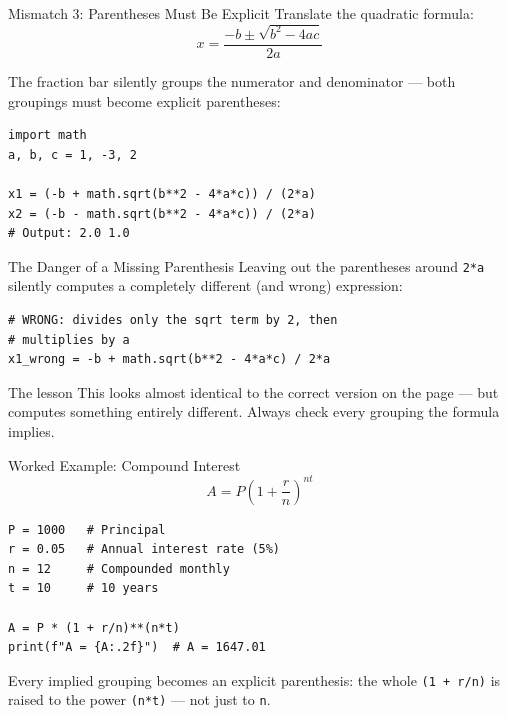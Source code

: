 \documentclass[9pt,aspectratio=169,xcolor=table]{beamer}
\begin{document}
\begin{frame}[fragile]{Mismatch 3: Parentheses Must Be Explicit}
    \leavevmode
    Translate the quadratic formula:
    \[
    x = \frac{-b \pm \sqrt{b^2 - 4ac}}{2a}
    \]

    The fraction bar silently groups the numerator and denominator ---
    both groupings must become explicit parentheses:

\begin{lstlisting}
import math
a, b, c = 1, -3, 2

x1 = (-b + math.sqrt(b**2 - 4*a*c)) / (2*a)
x2 = (-b - math.sqrt(b**2 - 4*a*c)) / (2*a)
# Output: 2.0 1.0
\end{lstlisting}
\end{frame}

\begin{frame}[fragile]{The Danger of a Missing Parenthesis}
    \leavevmode
    Leaving out the parentheses around \texttt{2*a} silently computes a
    \alert{completely different} (and wrong) expression:

\begin{lstlisting}
# WRONG: divides only the sqrt term by 2, then
# multiplies by a
x1_wrong = -b + math.sqrt(b**2 - 4*a*c) / 2*a
\end{lstlisting}

    \vspace{2mm}
    \begin{alertblock}{The lesson}
        This looks almost identical to the correct version on the page
        --- but computes something entirely different. Always check
        every grouping the formula implies.
    \end{alertblock}
\end{frame}

\begin{frame}[fragile]{Worked Example: Compound Interest}
    \leavevmode
    \[
    A = P\left(1 + \frac{r}{n}\right)^{nt}
    \]

\begin{lstlisting}
P = 1000   # Principal
r = 0.05   # Annual interest rate (5%)
n = 12     # Compounded monthly
t = 10     # 10 years

A = P * (1 + r/n)**(n*t)
print(f"A = {A:.2f}")  # A = 1647.01
\end{lstlisting}

    \vspace{1mm}
    {\small Every implied grouping becomes an explicit parenthesis: the
    whole \texttt{(1 + r/n)} is raised to the power \texttt{(n*t)} ---
    not just to \texttt{n}.}
\end{frame}
\end{document}
